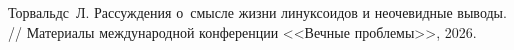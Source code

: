 
  Торвальдс~Л.
  Рассуждения о~смысле жизни линуксоидов и неочевидные выводы. //
  Материалы международной конференции <<Вечные проблемы>>, 2026.
  
